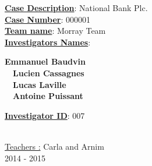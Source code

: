 \begin{titlepage}
\begin{center}
        \Large
        \vspace{1cm}
        \begin{minipage}{.8\textwidth}
          \underline{\textbf{Case Description}}: National Bank Plc.\\
          \underline{\textbf{Case Number}}: 000001\\
          \underline{\textbf{Team name}}: Morray Team\\
          \underline{\textbf{Investigators Names}}:
          \begin{center}
	    \textbf{Emmanuel Baudvin}\\~~\textbf{Lucien Cassagnes}\\~~\textbf{Lucas Laville}\\~~\textbf{Antoine Puissant}\\
          \end{center}
          \underline{\textbf{Investigator ID}}: 007\\
        \end{minipage}~\\
	\LARGE
        \vspace{0.8cm}
        \Large
        \underline{Teachers :} Carla and Arnim\\
        \vspace{0.5cm}
        2014 - 2015%
        
    \end{center}
\end{titlepage}